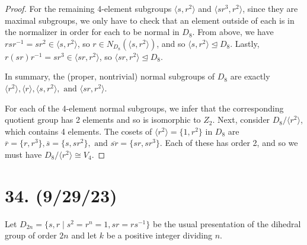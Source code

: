 \documentclass{article}
\begin{document}
\begin{proof}
For the remaining 4-element subgroups $\langle s, r^2 \rangle$ and $\langle sr^3, r^2 \rangle$, since they are maximal subgroups, we only have to check that an element outside of each is in the normalizer in order for each to be normal in $D_8$. From above, we have $rsr^{-1} = sr^2 \in \langle s, r^2 \rangle$, so $r \in N_{D_8}(\langle s, r^2 \rangle)$, and so $\langle s, r^2 \rangle \unlhd D_8$. Lastly, $r(sr)r^{-1} = sr^3 \in \langle sr, r^2 \rangle$, so $\langle sr, r^2 \rangle \unlhd D_8$.

In summary, the (proper, nontrivial) normal subgroups of $D_8$ are exactly $\langle r^2 \rangle, \langle r \rangle, \langle s, r^2 \rangle, \text{ and } \langle sr, r^2 \rangle$.

For each of the 4-element normal subgroups, we infer that the corresponding quotient group has 2 elements and so is isomorphic to $Z_2$. Next, consider $D_8/\langle r^2 \rangle$, which contains 4 elements. The cosets of $\langle r^2 \rangle = \{ 1, r^2 \}$ in $D_8$ are $\overline{r} = \{ r, r^3 \}, \overline{s} = \{ s, sr^2 \}, \text{ and } \overline{sr} = \{ sr, sr^3 \}$. Each of these has order 2, and so we must have $D_8/\langle r^2 \rangle \cong V_4$.

\end{proof}

\section*{34. (9/29/23)}

Let $D_{2n} = \{ s, r \mid s^2 = r^n = 1, sr = rs^{-1} \}$ be the usual presentation of the dihedral group of order $2n$ and let $k$ be a positive integer dividing $n$.
\end{document}
